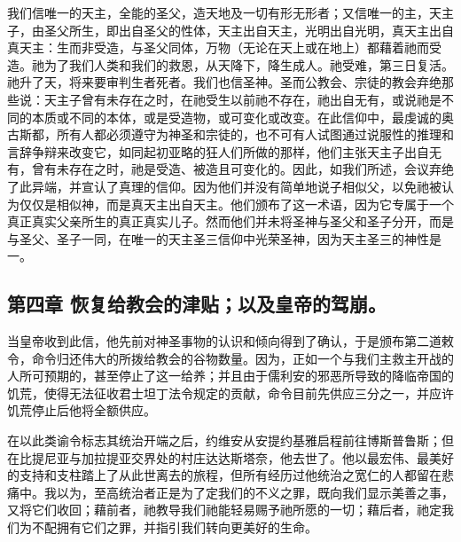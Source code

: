 我们信唯一的天主，全能的圣父，造天地及一切有形无形者；又信唯一的主，天主子，由圣父所生，即出自圣父的性体，天主出自天主，光明出自光明，真天主出自真天主：生而非受造，与圣父同体，万物（无论在天上或在地上）都藉着祂而受造。祂为了我们人类和我们的救恩，从天降下，降生成人。祂受难，第三日复活。祂升了天，将来要审判生者死者。我们也信圣神。圣而公教会、宗徒的教会弃绝那些说：天主子曾有未存在之时，在祂受生以前祂不存在，祂出自无有，或说祂是不同的本质或不同的本体，或是受造物，或可变化或改变。在此信仰中，最虔诚的奥古斯都，所有人都必须遵守为神圣和宗徒的，也不可有人试图通过说服性的推理和言辞争辩来改变它，如同起初亚略的狂人们所做的那样，他们主张天主子出自无有，曾有未存在之时，祂是受造、被造且可变化的。因此，如我们所述，会议弃绝了此异端，并宣认了真理的信仰。因为他们并没有简单地说子相似父，以免祂被认为仅仅是相似神，而是真天主出自天主。他们颁布了这一术语，因为它专属于一个真正真实父亲所生的真正真实儿子。然而他们并未将圣神与圣父和圣子分开，而是与圣父、圣子一同，在唯一的天主圣三信仰中光荣圣神，因为天主圣三的神性是一。\par


\subsection{第四章 恢复给教会的津贴；以及皇帝的驾崩。}

当皇帝收到此信，他先前对神圣事物的认识和倾向得到了确认，于是颁布第二道敕令，命令归还伟大的所拨给教会的谷物数量。因为，正如一个与我们主救主开战的人所可预期的，甚至停止了这一给养；并且由于儒利安的邪恶所导致的降临帝国的饥荒，使得无法征收君士坦丁法令规定的贡献，命令目前先供应三分之一，并应许饥荒停止后他将全额供应。\par

在以此类谕令标志其统治开端之后，约维安从安提约基雅启程前往博斯普鲁斯；但在比提尼亚与加拉提亚交界处的村庄达达斯塔奈，他去世了。他以最宏伟、最美好的支持和支柱踏上了从此世离去的旅程，但所有经历过他统治之宽仁的人都留在悲痛中。我以为，至高统治者正是为了定我们的不义之罪，既向我们显示美善之事，又将它们收回；藉前者，祂教导我们祂能轻易赐予祂所愿的一切；藉后者，祂定我们为不配拥有它们之罪，并指引我们转向更美好的生命。\par



